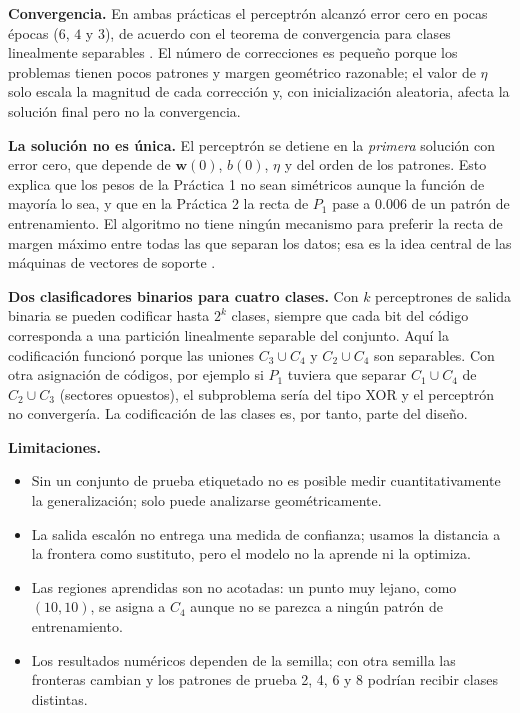 \documentclass[conference]{IEEEtran}
\begin{document}
\textbf{Convergencia.} En ambas prácticas el perceptrón alcanzó error cero en
pocas épocas ($6$, $4$ y $3$), de acuerdo con el teorema de convergencia para
clases linealmente separables \cite{b1}. El número de correcciones es pequeño
porque los problemas tienen pocos patrones y margen geométrico razonable; el
valor de $\eta$ solo escala la magnitud de cada corrección y, con
inicialización aleatoria, afecta la solución final pero no la convergencia.

\textbf{La solución no es única.} El perceptrón se detiene en la
\emph{primera} solución con error cero, que depende de $\mathbf{w}(0)$, $b(0)$,
$\eta$ y del orden de los patrones. Esto explica que los pesos de la
Práctica 1 no sean simétricos aunque la función de mayoría lo sea, y que en
la Práctica 2 la recta de $P_1$ pase a $0.006$ de un patrón de entrenamiento.
El algoritmo no tiene ningún mecanismo para preferir la recta de margen máximo
entre todas las que separan los datos; esa es la idea central de las máquinas
de vectores de soporte \cite{b1,b3}.

\textbf{Dos clasificadores binarios para cuatro clases.} Con $k$ perceptrones
de salida binaria se pueden codificar hasta $2^k$ clases, siempre que cada
bit del código corresponda a una partición linealmente separable del
conjunto. Aquí la codificación funcionó porque las uniones
$C_3\cup C_4$ y $C_2\cup C_4$ son separables. Con otra asignación de códigos,
por ejemplo si $P_1$ tuviera que separar $C_1\cup C_4$ de $C_2\cup C_3$
(sectores opuestos), el subproblema sería del tipo XOR y el perceptrón no
convergería. La codificación de las clases es, por tanto, parte del diseño.

\textbf{Limitaciones.}
\begin{itemize}
    \item Sin un conjunto de prueba etiquetado no es posible medir
    cuantitativamente la generalización; solo puede analizarse
    geométricamente.
    \item La salida escalón no entrega una medida de confianza; usamos la
    distancia a la frontera como sustituto, pero el modelo no la aprende ni
    la optimiza.
    \item Las regiones aprendidas son no acotadas: un punto muy lejano, como
    $(10,10)$, se asigna a $C_4$ aunque no se parezca a ningún patrón de
    entrenamiento.
    \item Los resultados numéricos dependen de la semilla; con otra semilla
    las fronteras cambian y los patrones de prueba 2, 4, 6 y 8 podrían
    recibir clases distintas.
\end{itemize}
\end{document}
